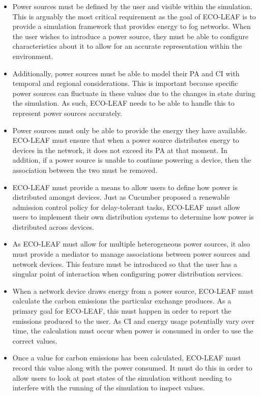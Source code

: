 \documentclass{l4proj}
\begin{document}
\begin{itemize}
    \item Power sources must be defined by the user and visible within the simulation. This is arguably the most critical requirement as the goal of ECO-LEAF is to provide a simulation framework that provides energy to fog networks. When the user wishes to introduce a power source, they must be able to configure characteristics about it to allow for an accurate representation within the environment.
    \item Additionally, power sources must be able to model their PA and CI with temporal and regional considerations. This is important because specific power sources can fluctuate in these values due to the changes in state during the simulation. As such, ECO-LEAF needs to be able to handle this to represent power sources accurately.
    \item Power sources must only be able to provide the energy they have available. ECO-LEAF must ensure that when a power source distributes energy to devices in the network, it does not exceed its PA at that moment. In addition, if a power source is unable to continue powering a device, then the association between the two must be removed.
    \item ECO-LEAF must provide a means to allow users to define how power is distributed amongst devices. Just as Cucumber \citep{cucumber} proposed a renewable admission control policy for delay-tolerant tasks, ECO-LEAF must allow users to implement their own distribution systems to determine how power is distributed across devices.
    \item As ECO-LEAF must allow for multiple heterogeneous power sources, it also must provide a mediator to manage associations between power sources and network devices. This feature must be introduced so that the user has a singular point of interaction when configuring power distribution services.
    \item When a network device draws energy from a power source, ECO-LEAF must calculate the carbon emissions the particular exchange produces. As a primary goal for ECO-LEAF, this must happen in order to report the emissions produced to the user. As CI and energy usage potentially vary over time, the calculation must occur when power is consumed in order to use the correct values.
    \item Once a value for carbon emissions has been calculated, ECO-LEAF must record this value along with the power consumed. It must do this in order to allow users to look at past states of the simulation without needing to interfere with the running of the simulation to inspect values.

\end{itemize}
\end{document}

